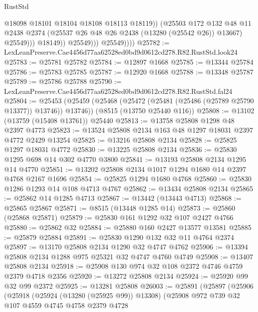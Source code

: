 \begin{lexlean}{RustStd}
\begin{coremodule}
                              @18098
                              @18101
                              @18104
                              @18108
                              @18113
                              @18119))
                          (@25503
                            @172
                            @132
                            @48
                            @11
                            @2438
                            @2374
                            (@25537 @26 @48 @26 @2438 (@13280 (@25542 @26)) @13667)
                            @25549)))
                      @18149))
                  @25549)))
            @25549))))
@25782 := LexLeanPreserve.Cae4456d77aa62528ed0bd9d0612cd278.R82.RustStd.look24
@25783 := @25781 @25782
@25784 := @12897 @1668
@25785 := @13344 @25784
@25786 := @25783 @25785
@25787 := @12920 @1668
@25788 := @13348 @25787
@25789 := @25786 @25788
@25790 := LexLeanPreserve.Cae4456d77aa62528ed0bd9d0612cd278.R82.RustStd.fal24
@25804 := @25453
    (@25459 (@25468 (@25472 (@25481 (@25486 (@25789 @25790 @13377)) @13746)) @13746))
    (@8515 (@13750 @25440 @116))
@25808 := @13102 (@13759 (@15408 @13761)) @25440
@25813 := @13758 @25808 @1298 @48 @2397 @4773
@25823 := @13524 @25808 @2134 @163 @48 @1297 @18031 @2397 @4772 @2429 @13254
@25825 := @13216 @25808 @2134
@25828 := @25825 @1297 @18031 @4772
@25830 := @13225 @25808 @2134
@25836 := @25830 @1295 @698 @14 @302 @4770 @3800
@25841 := @13193 @25808 @2134 @1295 @14 @4770
@25851 := @13202 @25808 @2134 @1017 @1294 @1680 @14 @2397 @4768 @2167 @1696
@25854 := @25825 @1294 @1680 @4768
@25860 := @25830 @1286 @1293 @14 @108 @4713 @4767
@25862 := @13434 @25808 @2134
@25865 := @25862 @14 @1285 @4713
@25867 := @13442 (@13443 @4713)
@25868 := @25865 @25867
@25871 := @8515 (@13448 @1285 @14)
@25873 := @25860 (@25868 @25871)
@25879 := @25830 @161 @1292 @32 @107 @2427 @4766
@25880 := @25862 @32
@25884 := @25880 @160 @2427 @13577 @13581
@25885 := @25879 @25884
@25891 := @25830 @1290 @132 @32 @11 @4764 @2374
@25897 := @13170 @25808 @2134 @1290 @32 @4747 @4762
@25906 := @13394 @25808 @2134 @1288 @975 @25321 @32 @4747 @4760 @4749
@25908 := @13407 @25808 @2134
@25918 := @25908 @130 @974 @32 @108 @2372 @4746 @4759 @2379 @4718 @2356
@25920 := @13272 @25808 @2134
@25924 := @25920 @99 @32 @99 @2372
@25925 := @13281 @25808
@26003 := @25891
    (@25897
      (@25906
        (@25918
          (@25924 (@13280 (@25925 @99)) @13308)
          (@25908
            @972
            @739
            @32
            @107
            @4559
            @4745
            @4758
            @2379
            @4728

\end{coremodule}
\end{lexlean}
